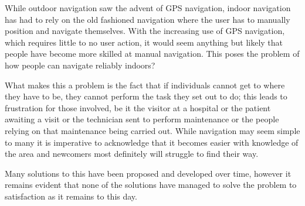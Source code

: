 While outdoor navigation saw the advent of GPS navigation, indoor navigation has had to rely on the old fashioned navigation where the user has to manually position and navigate themselves. With the increasing use of GPS navigation, which requires little to no user action, it would seem anything but likely that people have become more skilled at manual navigation. This poses the problem of how people can navigate reliably indoors?

What makes this a problem is the fact that if individuals cannot get to where they have to be, they cannot perform the task they set out to do; this leads to frustration for those involved, be it the visitor at a hospital or the patient awaiting a visit or the technician sent to perform maintenance or the people relying on that maintenance being carried out. While navigation may seem simple to many it is imperative to acknowledge that it becomes easier with knowledge of the area and newcomers most definitely will struggle to find their way.

Many solutions to this have been proposed and developed over time, however it remains evident that none of the solutions have managed to solve the problem to satisfaction as it remains to this day.
